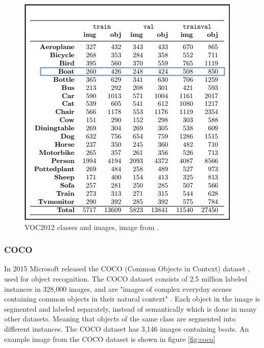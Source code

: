 \begin{figure}[h!]
    \centering
    \includegraphics[scale=0.4]{fig/VOC2012.png}
    \caption{VOC2012 classes and images, image from \citep{Everingham2012}.}
    \label{fig:VOC2012}
\end{figure}

\clearpage

\subsubsection{COCO}
In 2015 Microsoft released the COCO (Common Objects in Context) dataset \citep{Lin2014}, used for object recognition. The COCO dataset consists of 2.5 million labeled instances in 328,000 images, and are "images of complex everyday scenes containing common objects in their natural context" \citep{Lin2014}. Each object in the image is segmented and labeled separately, instead of semantically which is done in many other datasets. Meaning that objects of the same class are segmented into different instances. The COCO dataset has 3,146 images containing boats. An example image from the COCO dataset is shown in figure \ref{fig:coco}

